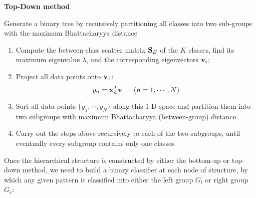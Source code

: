 \documentclass{article}
\begin{document}
{\bf Top-Down method}

  Generate a binary tree by recursively partitioning all classes
  into two sub-groups with the maximum Bhattacharyya distance

  \begin{enumerate}
  \item Compute the between-class scatter matrix ${\bf S}_B$ of the 
    $K$ classes, find its maximum eigenvalue $\lambda_i$ and the 
    corresponding eigenvectors ${\bf v}_i$;

  \item Project all data points onto ${\bf v}_1$:
    \begin{equation} 
    y_n={\bf x}^T_n {\bf v}\;\;\;\;\;\;(n=1,\cdots,N)
    \end{equation}

  \item Sort all data points $\{y_1,\cdots,y_N\}$ along this 1-D space
    and partition them into two subgroups with maximum Bhattacharyya
    (between-group) distance.

  \item Carry out the steps above recursively to each of the two
    subgroups, until eventually every subgroup contains only one 
    classes

  \end{enumerate}
    
Once the hierarchical structure is constructed by either the bottom-up
or top-down method, we need to build a binary classifier at each node
of structure, by which any given pattern is classified into either the
left group $G_l$ or right group $G_r$:
\end{document}
